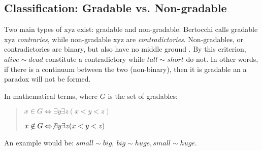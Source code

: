 \footnotetext[1]{}
\footnotetext[2]{}

\subsection {Classification: Gradable vs. Non-gradable}
\label{classification}
Two main types of xyz exist: gradable and non-gradable. Bertocchi calls gradable xyz \textit{contraries}, while non-gradable xyz are \textit{contradictories}.   Non-gradables, or contradictories are binary, but also have no middle ground \cite{Bertocchi}.  By this criterion, $alive\sim dead$ constitute a contradictory while $tall\sim short$ do not.  In other words, if there is a continuum between the two (non-binary), then it is gradable an a paradox will not be formed. 

In mathematical terms, where $G$ is the set of gradables:
	\begin{quote}
		$x \in G\Leftrightarrow \exists y\exists z(x<y<z)$

		$x \not\in G\Leftrightarrow \not\exists y\exists z(x<y<z)$
	\end{quote}

An example would be: $small\sim big, ~big\sim huge, small\sim huge$.